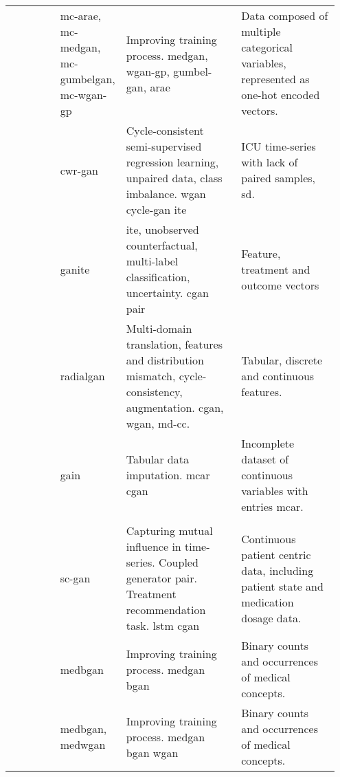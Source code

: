 \begin{landscape}
\begin{longtable}[l]{@{}p{0.15\linewidth}p{0.15\linewidth}p{0.35\linewidth}p{0.3\linewidth}@{}}
        \hline
        \quad 2018 & & & \\
        \hline
        
        \citeauthor{Camino2018-re} & \raggedright \gls{mc-arae}, \gls{mc-medgan}, \gls{mc-gumbelgan}, \gls{mc-wgan-gp}
        & Improving training process. \gls{medgan}, \gls{wgan-gp}, \gls{gumbel-gan}, \gls{arae}
        & Data composed of multiple categorical variables, represented as one-hot encoded vectors. \\
        
        \citeauthor{mcdermott2018semi} & \gls{cwr-gan}
        & Cycle-consistent semi-supervised regression learning, unpaired data, class imbalance. \gls{wgan} \gls{cycle-gan} \gls{ite}
        & ICU time-series with lack of paired samples, \gls{sd}. \\
        
        \citeauthor{Yoon2018-ite} & \gls{ganite} 
        & \gls{ite}, unobserved counterfactual, multi-label classification, uncertainty. \gls{cgan} pair
        & Feature, treatment and outcome vectors\\
        
        \citeauthor{Yoon2018-radial} & \gls{radialgan} 
        & Multi-domain translation, features and distribution mismatch, cycle-consistency, augmentation. \gls{cgan}, \gls{wgan}, \gls{md-cc}.
        & Tabular, discrete and continuous features.\\
        
        \citeauthor{yoon2018imputation} & \gls{gain}
        & Tabular data imputation. \gls{mcar} \gls{cgan}
        & Incomplete dataset of continuous variables with entries \gls{mcar}.\\
        
        \hline
        \quad 2019 & & & \\
        \hline
        
        \citeauthor{Wang_2019} & \gls{sc-gan}
        & Capturing mutual influence in time-series. Coupled generator pair. Treatment recommendation task. \gls{lstm} \gls{cgan}
        & Continuous patient centric data, including patient state and medication dosage data.\\
        
        \citeauthor{baowaly_2019_IEEE} & \gls{medbgan}
        & Improving training process. \gls{medgan} \gls{bgan}
        & Binary counts and occurrences of medical concepts.\\
        
        \citeauthor{baowaly_2019_jamia} & \gls{medbgan}, \gls{medwgan}
        & Improving training process. \gls{medgan} \gls{bgan} \gls{wgan}
        & Binary counts and occurrences of medical concepts.\\
        

\end{longtable}
\end{landscape}
